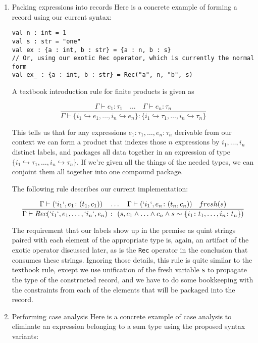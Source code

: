 \documentclass[11pt]{article}
\begin{document}
\begin{enumerate}
\item Packing expressions into records
\label{sec:org7612704}
Here is a concrete example of forming a record using our current syntax:

\begin{verbatim}
val n : int = 1
val s : str = "one"
val ex : {a : int, b : str} = {a : n, b : s}
// Or, using our exotic Rec operator, which is currently the normal form
val ex_ : {a : int, b : str} = Rec("a", n, "b", s)
\end{verbatim}

A textbook introduction rule for finite products is given as

$$
\frac
{ \Gamma \vdash e_1 \colon \tau_1 \quad \ldots \quad \Gamma \vdash e_n \colon \tau_n }
{ \Gamma \vdash \{ i_1 \hookrightarrow e_1, \ldots, i_n \hookrightarrow e_n \} \colon \{ i_1 \hookrightarrow \tau_1, \ldots, i_n \hookrightarrow \tau_n \} }
$$

This tells us that for any expressions
\(e_1 : \tau_1, \ldots, e_n : \tau_n\) derivable from our context we can
form a product that indexes those \(n\) expressions by
\(i_1, \ldots, i_n\) distinct labels, and packages all data together in
an expression of type
\(\{ i_1 \hookrightarrow \tau_1, \ldots, i_n \hookrightarrow \tau_n \}\).
If we're given all the things of the needed types, we can conjoint them
all together into one compound package.

The following rule describes our current implementation:

$$
\frac
{ \Gamma \vdash (`i_1`, e_1 \colon (t_1, c_1)) \quad \ldots \quad \Gamma \vdash (`i_1`, e_n \colon (t_n, c_n)) \quad fresh(s) }
{ \Gamma \vdash Rec(`i_1`, e_1, \ldots, `i_n`, e_n) \ \colon \ (s, c_1 \land \ldots \land c_n \land s \sim \{ i_1 \colon t_1, \ldots, i_n \colon t_n \}) }
$$

The requirement that our labels show up in the premise as quint strings
paired with each element of the appropriate type is, again, an artifact
of the exotic operator discussed later, as is the \texttt{Rec} operator in the
conclusion that consumes these strings. Ignoring those details, this
rule is quite similar to the textbook rule, except we use unification of
the fresh variable \texttt{s} to propagate the type of the constructed record,
and we have to do some bookkeeping with the constraints from each of the
elements that will be packaged into the record.

\item Performing case analysis
\label{sec:orge6937d0}
Here is a concrete example of case analysis to eliminate an expression
belonging to a sum type using the proposed syntax variants:


\end{enumerate}
\end{document}
